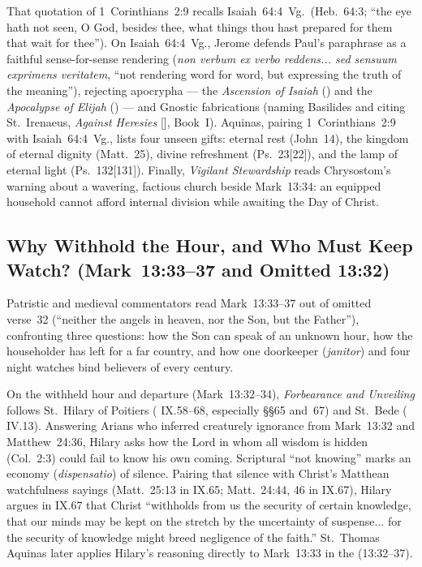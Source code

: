 That quotation of 1~Corinthians~2:9 recalls Isaiah~64:4~Vg.\ (Heb.~64:3; ``the eye hath not seen, O God, besides thee, what things thou hast prepared for them that wait for thee''). On Isaiah~64:4~Vg., Jerome defends Paul's paraphrase as a faithful sense-for-sense rendering (\emph{non verbum ex verbo reddens... sed sensuum exprimens veritatem}, ``not rendering word for word, but expressing the truth of the meaning''), rejecting apocrypha --- the \emph{Ascension of Isaiah} () and the \emph{Apocalypse of Elijah} () --- and Gnostic fabrications (naming Basilides and citing St.~Irenaeus, \emph{Against Heresies} [], Book~I). Aquinas, pairing 1~Corinthians~2:9 with Isaiah~64:4~Vg., lists four unseen gifts: eternal rest (John~14), the kingdom of eternal dignity (Matt.~25), divine refreshment (Ps.~23[22]), and the lamp of eternal light (Ps.~132[131]). Finally, \emph{Vigilant Stewardship} reads Chrysostom's warning about a wavering, factious church beside Mark~13:34: an equipped household cannot afford internal division while awaiting the Day of Christ.

\subsection{Why Withhold the Hour, and Who Must Keep Watch? (Mark~13:33--37 and Omitted 13:32)}

Patristic and medieval commentators read Mark~13:33--37 out of omitted verse~32 (``neither the angels in heaven, nor the Son, but the Father''), confronting three questions: how the Son can speak of an unknown hour, how the householder has left for a far country, and how one doorkeeper (\emph{janitor}) and four night watches bind believers of every century.

On the withheld hour and departure (Mark~13:32--34), \emph{Forbearance and Unveiling} follows St.~Hilary of Poitiers ( IX.58--68, especially §§65 and~67) and St.~Bede ( IV.13). Answering Arians who inferred creaturely ignorance from Mark~13:32 and Matthew~24:36, Hilary asks how the Lord in whom all wisdom is hidden (Col.~2:3) could fail to know his own coming. Scriptural ``not knowing'' marks an economy (\emph{dispensatio}) of silence. Pairing that silence with Christ's Matthean watchfulness sayings (Matt.~25:13 in IX.65; Matt.~24:44, 46 in IX.67), Hilary argues in IX.67 that Christ ``withholds from us the security of certain knowledge, that our minds may be kept on the stretch by the uncertainty of suspense... for the security of knowledge might breed negligence of the faith.'' St.~Thomas Aquinas later applies Hilary's reasoning directly to Mark~13:33 in the  (13:32--37).

